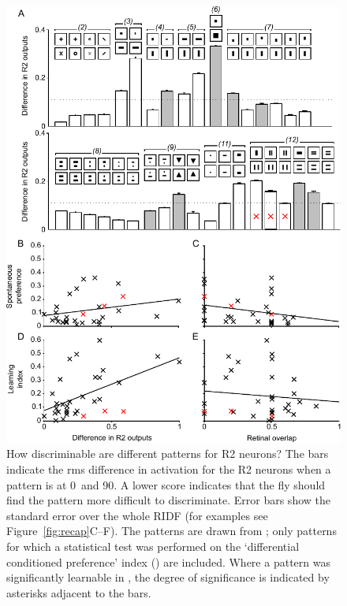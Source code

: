 \begin{figure}
\centering
\includegraphics{figures/pattern}
\caption{How discriminable are different patterns for R2 neurons?
The bars indicate the \ac{rms} difference in activation for the R2 neurons when a pattern is at 0\textdegree\ and 90\textdegree.
A lower score indicates that the fly should find the pattern more difficult to discriminate.
Error bars show the standard error over the whole \ac{RIDF} (for examples see Figure~\ref{fig:recap}C--F).
The patterns are drawn from \protect{}; only patterns for which a statistical test was performed on the `differential conditioned preference' index () are included.
Where a pattern was significantly learnable in \protect{}, the degree of significance is indicated by asterisks adjacent to the bars.
}
\label{fig:pattern}
\end{figure}
